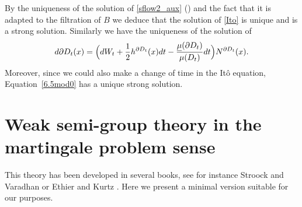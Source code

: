 \documentclass[JEP,XML,SOM,Unicode,NoFloatCountersInSection,published]{cedram}
\theoremstyle{plain}
\theoremstyle{definition}
\let\f\frac
\begin{document}
By the uniqueness of the solution of \eqref{sflow2_aux} (\cf \cite[Th.\,22]{zbMATH07470497}) and the fact that it is adapted to the filtration of $B $ we deduce that the solution of \eqref{Ito} is unique and is a strong solution. Similarly we have the uniqueness of the solution of
\[
d \partial D_t (x) =\Bigl(dW_t+\f12h^{\partial D_t}(x)dt - \frac{\underline{\mu}( \partial D_t)}{\mu(D_t)} dt\Bigr)N^{\partial D_t}(x).
\]
Moreover, since we could also make a change of time in the Itô equation, Equation~\eqref{6.5mod0} has a unique strong solution.

\section{Weak semi-group theory in the martingale problem sense}\label{appD}

This theory has been developed in several books, see for instance Stroock and Varadhan \cite{MR2190038} or Ethier and Kurtz \cite{MR838085}.
Here we present a minimal version suitable for our purposes.
\end{document}
